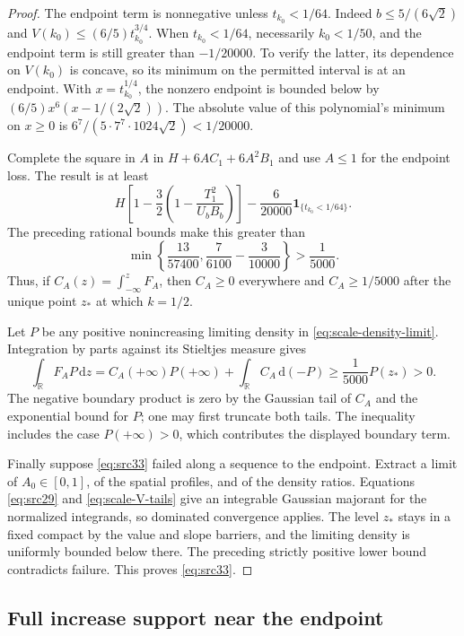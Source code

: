 \documentclass[11pt,a4paper]{article}
\numberwithin{equation}{section}
\theoremstyle{definition}
\theoremstyle{remark}
\newcommand{\R}{\mathbb R}
\newcommand{\dd}{\mathrm d}
\newcommand{\ind}{\mathbf 1}
\begin{document}
\begin{proof}
The endpoint term is nonnegative unless $t_{k_0}<1/64$.
Indeed $b\le5/(6\sqrt2)$ and $V(k_0)\le(6/5)t_{k_0}^{3/4}$.
When $t_{k_0}<1/64$, necessarily $k_0<1/50$, and the endpoint term
is still greater than $-1/20000$. To verify the latter, its dependence
on $V(k_0)$ is concave, so its minimum on the permitted interval is
at an endpoint. With $x=t_{k_0}^{1/4}$, the nonzero endpoint is
bounded below by
$(6/5)x^6(x-1/(2\sqrt2))$. The absolute value of this polynomial's
minimum on $x\ge0$ is
$6^7/(5\cdot7^7\cdot1024\sqrt2)<1/20000$.

Complete the square in $A$ in $H+6AC_1+6A^2B_1$ and use $A\le1$
for the endpoint loss. The result is at least
\[
 H\left[1-\frac32\left(1-\frac{T_1^2}{U_bB_b}\right)\right]
 -\frac6{20000}\ind_{\{t_{k_0}<1/64\}}.
\]
The preceding rational bounds make this greater than
\[
 \min\left\{\frac{13}{57400},\frac7{6100}-\frac3{10000}\right\}
 >\frac1{5000}.
\]
Thus, if $C_A(z)=\int_{-\infty}^zF_A$, then $C_A\ge0$ everywhere
and $C_A\ge1/5000$ after the unique point $z_*$ at which $k=1/2$.

Let $P$ be any positive nonincreasing limiting density in
\eqref{eq:scale-density-limit}. Integration by parts against its
Stieltjes measure gives
\[
 \int_\R F_A P\,\dd z
 =C_A(+\infty)P(+\infty)+\int_\R C_A\,\dd(-P)
 \ge \frac1{5000}P(z_*)>0.
\]
The negative boundary product is zero by the Gaussian tail of $C_A$
and the exponential bound for $P$; one may first truncate both tails.
The inequality includes the case $P(+\infty)>0$, which contributes
the displayed boundary term.

Finally suppose \eqref{eq:src33} failed along a sequence to the
endpoint. Extract a limit of $A_0\in[0,1]$, of the spatial profiles,
and of the density ratios. Equations
\eqref{eq:src29} and \eqref{eq:scale-V-tails} give an integrable
Gaussian majorant for the normalized integrands, so dominated
convergence applies. The level $z_*$ stays in a fixed compact by the
value and slope barriers, and the limiting density is uniformly
bounded below there. The preceding strictly positive lower bound
contradicts failure. This proves \eqref{eq:src33}.
\end{proof}

\subsection{Full increase support near the endpoint}
\end{document}
